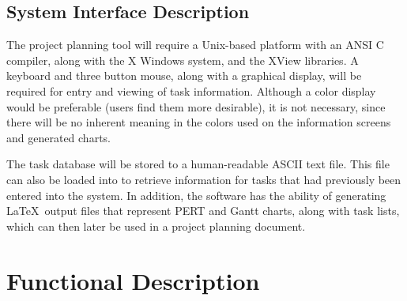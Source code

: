 %
%
\subsection{System Interface Description}

The project planning tool will require a Unix-based platform with an
ANSI C compiler, along with the X Windows system, and the XView
libraries.  A keyboard and three button mouse, along with a graphical
display, will be required for entry and viewing of task information.
Although a color display would be preferable (users find them more
desirable), it is not necessary, since there will be no inherent
meaning in the colors used on the information screens and generated
charts.

The task database will be stored to a human-readable ASCII text file.
This file can also be loaded into \xplan\/ to retrieve information for
tasks that had previously been entered into the system.  In addition,
the software has the ability of generating \LaTeX\ output files that
represent PERT and Gantt charts, along with task lists, which can then
later be used in a project planning document.


%
%
\section{Functional Description}

